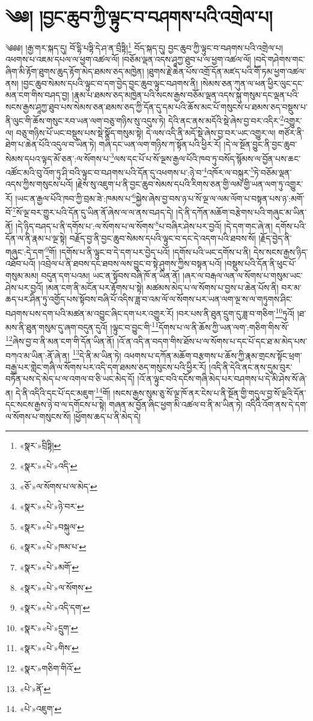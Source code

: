 \chapter{༄༅། །བྱང་ཆུབ་ཀྱི་ལྟུང་བ་བཤགས་པའི་འགྲེལ་པ།}༄༅༅། །རྒྱ་གར་སྐད་དུ། བོ་དྷི་པཏྟི་དེ་ཤ་ན་བྲྀཏྟི།\footnote{«སྣར་»བྲིཏྟི།} བོད་སྐད་དུ། བྱང་ཆུབ་ཀྱི་ལྟུང་བ་བཤགས་པའི་འགྲེལ་པ། འཕགས་པ་འཇམ་དཔལ་ལ་ཕྱག་འཚལ་ལོ། །བཅོམ་ལྡན་འདས་ཤཱཀྱ་ཐུབ་པ་ལ་ཕྱག་འཚལ་ལོ། །བདེ་གཤེགས་གང་ཞིག་མི་རྟོག་ཐུགས་ཆུད་རྟོག་མེད་ཐམས་ཅད་མཁྱེན། །ཐུགས་རྗེ་ཆེན་པོས་འགྲོ་དོན་མཛད་པའི་གཽ་ཏམ་ཕྱག་འཚལ་ནས། །བྱང་ཆུབ་སེམས་དཔའི་ལྟུང་བ་དག་བྱེད་བྱང་ཆུབ་ལྟུང་བཤགས་ནི། །སེམས་ཅན་ཀུན་ལ་ཕན་ཕྱིར་ལུང་དང་མན་ངག་གིས་བཤད་བྱ། །རྣམ་པ་ཐམས་ཅད་མཁྱེན་པའི་སངས་རྒྱས་བཅོམ་ལྡན་འདས་སྐུ་གསུམ་དང་ལྡན་པའི་སངས་རྒྱས་ཤཱཀྱ་ཐུབ་པས་སེམས་ཅན་ཐམས་ཅད་ཀྱི་དོན་དུ་དམ་པའི་ཆོས་མང་པོ་གསུངས་པ་ཐམས་ཅད་བསྡུས་པ་ནི་ལུང་གི་ཆོས་གསུང་རབ་ཡན་ལག་བཅུ་གཉིས་སུ་འདུས་ཏེ། དེའི་ནང་ནས་མདོའི་སྡེ་ཞེས་བྱ་བར་འདིར་\footnote{«སྣར་»«པེ་»འདི་}འགྱུར་ལ། བཅུ་གཉིས་པོ་ཡང་བསྡུས་པས་སྡེ་སྣོད་གསུམ་སྟེ། དེ་ལས་འདི་ནི་མདོ་སྡེ་ཞེས་བྱ་བར་ཡང་འགྱུར་ལ། གཙོར་ནི་ཐེག་པ་ཆེན་པོའི་འདུལ་བ་ཡིན་ཏེ། གཞི་དང་ཡན་ལག་གཉིས་ཀ་སྟོན་པའི་ཕྱིར་རོ། །དེ་ལ་སྔོན་བྱུང་ནི་བྱང་ཆུབ་སེམས་དཔའ་ལྟད་མོ་ཅན་:ལ་སོགས་པ་\footnote{«ཅོ་»ལ་སོགས་པ་ལ་མེད་}ལས་དང་པོ་པ་སོ་ལྔས་རྒྱལ་པོའི་ཁབ་ཏུ་བསོད་སྙོམས་ལ་བྱོན་པས་ཆང་འཚོང་མའི་བུ་འོག་ཏུ་ཤི་བའི་ལྟུང་བ་བཤགས་པའི་དོན་དུ་འཕགས་པ་:ཉེ་བ་\footnote{«སྣར་»«པེ་»ཉེ་བར་}འཁོར་ལ་བསྐུར་\footnote{«སྣར་»«པེ་»བསྐུལ་}ཏེ་བཅོམ་ལྡན་འདས་ཀྱིས་གསུངས་པའོ། །རྗེས་སུ་འཇུག་པ་ནི་བྱང་ཆུབ་སེམས་དཔའི་རིགས་ཅན་གྱི་ལམ་གྱི་ཡན་ལག་ཏུ་འགྱུར་རོ། །ཡང་ན་རྒྱལ་པོའི་ཁབ་ཀྱི་བྲམ་ཟེ་:ཁམས་པ་\footnote{«སྣར་»«པེ་»ཁམ་པ་}སྐྱེས་ཞེས་བྱ་བས་ཉ་པ་སོ་ལྔ་ལ་ལམ་ལོག་པ་བསྟན་པས་ཉ་:མགོ་བོ་\footnote{«སྣར་»«པེ་»མགོ་}སོ་ལྔ་བར་གྱུར་པའི་དོན་དུ་ཡིན་ནོ་ཞེས་ལ་ལ་ནས་བཤད་དེ། །དེ་ནི་དཀོན་མཆོག་བརྩེགས་པའི་གཞུང་མ་ཡིན་ནོ། །དེ་ཉིད་བཤད་པ་ནི་དགོས་པ་:ལ་སོགས་པ་ལ་སོགས་\footnote{«སྣར་»«པེ་»ལ་སོགས་}པ་བཞིར་ཤེས་པར་བྱའོ། །དེ་དག་གང་ཞེ་ན། དགོས་པའི་དོན་ལ་ནི་རྣམ་པ་ལྔ་སྟེ། བརྗོད་བྱ་ནི་བྱང་ཆུབ་སེམས་དཔའི་ལྟུང་བ་དང་དེ་འདག་པའི་ཐབས་སོ། །རྗོད་བྱེད་ནི་གཞུང་:དེ་དག་\footnote{«སྣར་»«པེ་»འདི་དག་}གོ། །དགོས་པ་ནི་ལྟུང་བ་དེ་དག་པར་བྱེད་པའོ། །དགོས་པའི་ཡང་དགོས་པ་ནི། དེས་སངས་རྒྱས་ཉིད་འཐོབ་པའོ། །འབྲེལ་པ་ནི་ཐབས་དང་ཐབས་ལས་བྱུང་བ་སྟེ་ཤུགས་ཀྱིས་བསྟན་པའོ། །བསྡུས་པའི་དོན་ནི་ཕུང་པོ་གསུམ་མམ། བདུན་དག་པའམ། ཡང་ན་སྟོབས་བཞི་ཁོ་ན་ཡིན་ནོ། །ཞར་ལ་བརྒལ་ལན་ལ་སོགས་པ་གསུམ་ཡང་ཤེས་པར་བྱའོ། །མན་ངག་ནི་མངོན་པར་རྟོགས་པ་སྟེ། མཚམས་མེད་པ་ལ་སོགས་པ་བྱས་པ་ཆེན་པོས་ནི། བར་མ་ཆད་པར་ཤིན་ཏུ་འགྱོད་པས་སྟོབས་བཞི་པོ་འདིས་ཟླ་བ་འམ་ལོ་ལ་སོགས་པར་ཡན་ལག་ལྔ་ས་ལ་གཏུགས་ཤིང་བཤགས་པས་དག་པའི་མཚན་མ་འབྱུང་ཞིང་དག་པར་འགྱུར་རོ། །བར་པས་ནི་ཐུན་དྲུག་དུ་ཟླ་བ་གཅིག་\footnote{«སྣར་»«པེ་»དྲུག་}ཏུའོ། །ཐ་མས་ནི་ཐུན་གསུམ་དུ་ཞག་བདུན་དུའོ། །ལྟུང་བ་བྱུང་གི་\footnote{«སྣར་»«པེ་»གིས་}དོགས་པ་ལ་ནི་ཆོས་ཀྱི་ཡན་ལག་:གཅིག་གིས་སོ་\footnote{«སྣར་»གཅིག་གིའོ་}ཞེས་བྱ་བ་ནི་མན་ངག་གི་དོན་ཡིན་ནོ། །འོ་ན་འདི་ན་བདག་གིས་ཐོས་པ་ལ་སོགས་པ་དང་པོ་དང་ཐ་མ་མེད་པས་བཀའ་མ་ཡིན་:ནོ་ཞེ་ན། \footnote{«པེ་»ནོ་}དེ་ནི་མ་ཡིན་ཏེ། འཕགས་པ་དཀོན་མཆོག་བརྩགས་པ་ཆོས་ཀྱི་རྣམ་གྲངས་སྟོང་ཕྲག་བརྒྱ་པར་གླེང་གཞི་ལ་སོགས་པར་འདི་དག་ཐམས་ཅད་གསུངས་པའི་ཕྱིར་རོ། །འདི་ནི་དེའི་ནང་ནས་དུམ་བུར་བཏོན་པས་དེ་མེད་པ་ལ་འགལ་བ་ཅི་ཡང་མེད་དོ། །འོ་ན་ལྟུང་བའི་དངོས་གཞི་མེད་པར་བཤགས་པ་དེ་མི་ཤེས་སོ་ཞེ་ན། དེ་ནི་འདིའི་དང་པོ་དང་མཇུག་\footnote{«པེ་»འཇུག་}གོ། །སངས་རྒྱས་སུམ་ཅུ་སོ་ལྔ་ཁོ་ནར་ངེས་པ་ནི་སྔོན་གྱི་གདུལ་བྱ་སོ་ལྔའི་དོན་དང་སངས་རྒྱས་ཉེ་བ་ལ་དགོངས་པ་སྟེ། གཞན་མ་བྱོན་ཞིང་ཕྱག་མི་འཚལ་བ་ནི་མ་ཡིན་ཏེ། འདིའི་འོག་ནས་དེ་དག་ལ་སོགས་པ་གསུངས་སོ། །ཕྱོགས་ཆད་པ་ནི་མེད་དེ། 